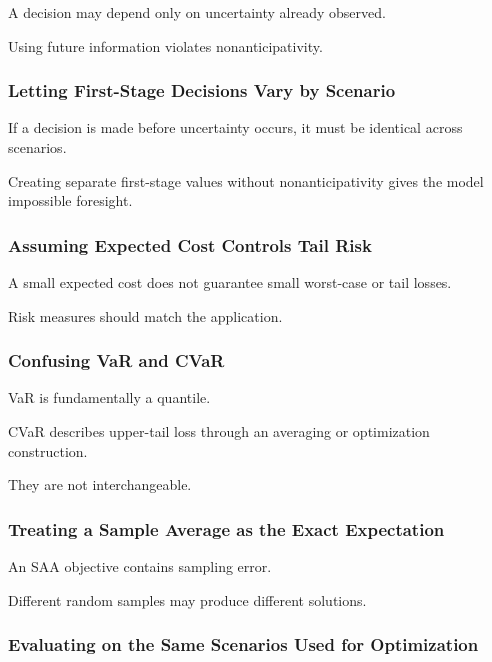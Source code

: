 A decision may depend only on uncertainty already observed.

Using future information violates nonanticipativity.

\subsubsection{Letting First-Stage Decisions Vary by Scenario}

If a decision is made before uncertainty occurs, it must be identical
across scenarios.

Creating separate first-stage values without nonanticipativity gives the
model impossible foresight.

\subsubsection{Assuming Expected Cost Controls Tail Risk}

A small expected cost does not guarantee small worst-case or tail losses.

Risk measures should match the application.

\subsubsection{Confusing VaR and CVaR}

VaR is fundamentally a quantile.

CVaR describes upper-tail loss through an averaging or optimization
construction.

They are not interchangeable.

\subsubsection{Treating a Sample Average as the Exact Expectation}

An SAA objective contains sampling error.

Different random samples may produce different solutions.

\subsubsection{Evaluating on the Same Scenarios Used for Optimization}

